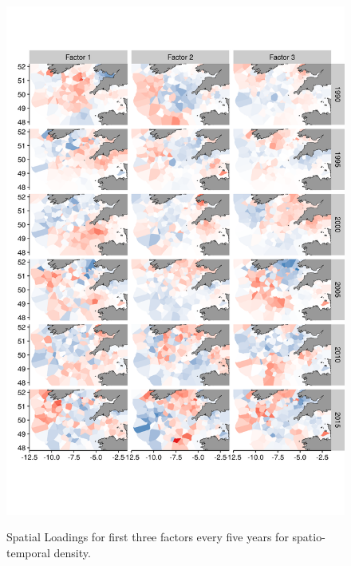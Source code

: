 \documentclass{article}
\begin{document}
\begin{figure}[!ht]
\begin{center}
	\includegraphics[width = 0.8\linewidth]{"figures/Suppl - SpatioTempLoadingsEpsilon2"}
	\label{fig:S7}
	\caption{Spatial Loadings for first three factors every five years for
	spatio-temporal density.}
	\end{center}
\end{figure}
\end{document}
